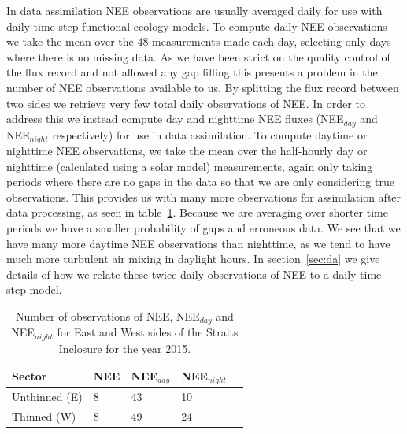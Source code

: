 \documentclass[12pt]{article}
\begin{document}
In data assimilation NEE observations are usually averaged daily for use with daily time-step functional ecology models. To compute daily NEE observations we take the mean over the 48 measurements made each day, selecting only days where there is no missing data. As we have been strict on the quality control of the flux record and not allowed any gap filling this presents a problem in the number of NEE observations available to us. By splitting the flux record between two sides we retrieve very few total daily observations of NEE. In order to address this we instead compute day and nighttime NEE fluxes (NEE\(_{day}\) and NEE\(_{night}\) respectively) for use in data assimilation. To compute daytime or nighttime NEE observations, we take the mean over the half-hourly day or nighttime (calculated using a solar model) measurements, again only taking periods where there are no gaps in the data so that we are only considering true observations. This provides us with many more observations for assimilation after data processing, as seen in table~\ref{table:nee_obs}. Because we are averaging over shorter time periods we have a smaller probability of gaps and erroneous data. We see that we have many more daytime NEE observations than nighttime, as we tend to have much more turbulent air mixing in daylight hours. In section~\ref{sec:da} we give details of how we relate these twice daily observations of NEE to a daily time-step model.     

\begin{table}[ht] 
	\caption{Number of observations of NEE, NEE\(_{day}\) and NEE\(_{night}\) for East and West sides of the Straits Inclosure for the year 2015.}
\begin{center}
	\begin{tabular}{| l | l | l | l | l |}
	\hline
	Sector & NEE & NEE\(_{day}\) & NEE\(_{night}\)  \\ \hline
	Unthinned (E) & 8 & 43 & 10 \\ \hline
	Thinned (W) & 8 & 49 & 24 \\ \hline
	\end{tabular}
	\label{table:nee_obs}
\end{center} 
\end{table}
\end{document}
